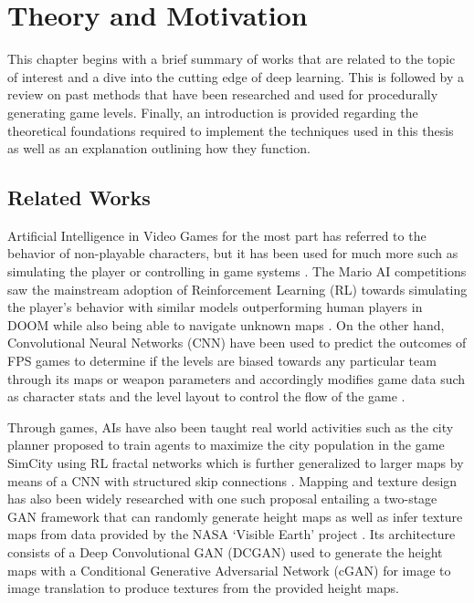 \documentclass{Configuration_Files/PoliMi3i_thesis}
\begin{document}
\chapter{Theory and Motivation}
\label{ch:theory and motivation}%
This chapter begins with a brief summary of works that are related to the topic of interest 
and a dive into the cutting edge of deep learning. This is followed by a review on past methods 
that have been researched and used for procedurally
generating game levels. Finally, an introduction is provided regarding the theoretical 
foundations required to implement the techniques used in this thesis as well as an explanation 
outlining how they function.

\section{Related Works}
Artificial Intelligence in Video Games for the most part has referred to the behavior 
of non-playable characters, but it has been used for much more such 
as simulating the player or controlling in game systems \cite{JiL20,DaK21}. The 
Mario AI competitions \cite{KaS12} saw the mainstream adoption of Reinforcement Learning 
(RL) towards simulating the player's behavior with similar models outperforming 
human players in DOOM while also being able to navigate unknown maps \cite{GuL16}. 
On the other hand, Convolutional Neural Networks (CNN) have been used to predict the 
outcomes of FPS games to determine if the levels are biased towards any particular team through its maps 
or weapon parameters and accordingly modifies game data such as character stats and the level layout 
to control the flow of the game \cite{DaK21}.

Through games, AIs have also been taught real world activities such as the city 
planner proposed  to train agents to maximize the city population in the game SimCity 
using RL fractal networks which is further generalized to larger maps by means of a  
CNN with structured skip connections \cite{SaE20}. Mapping and texture design has 
also been widely researched with one such proposal entailing a two-stage GAN framework 
that can randomly generate height maps as well as infer texture maps from data 
provided by the NASA ‘Visible Earth’ project \cite{ChB17}. Its architecture consists of a Deep 
Convolutional GAN (DCGAN) used to generate the height maps with a Conditional Generative
Adversarial Network (cGAN) for image to image translation to produce textures from the 
provided height maps. 
\end{document}
